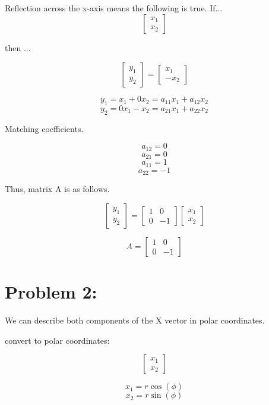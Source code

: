 \begin{enumerate}
\noindent Reflection across the x-axis means the following is true. If...
\[
\begin{bmatrix}
x_1 \\
x_2
\end{bmatrix}
\]

\noindent then ...

\[    
\begin{bmatrix}
y_1 \\
y_2
\end{bmatrix}
= 
\begin{bmatrix}
x_1 \\
-x_2
\end{bmatrix}
\]

\[y_1 = x_1 + 0x_2 = a_{11}x_1+a_{12}x_2\]
\[y_2 = 0x_1-x_2  = a_{21}x_1+a_{22}x_2\]

\noindent Matching coefficients.

\[a_{12} = 0\]
\[a_{21} = 0\]
\[a_{11} = 1\]
\[a_{22} = -1\]

\noindent Thus, matrix A is as follows.

\[
\begin{bmatrix}
y_1 \\
y_2
\end{bmatrix} = 
\begin{bmatrix}
    1 & 0 \\
    0 & -1
\end{bmatrix}  
\begin{bmatrix}
    x_1 \\
    x_2
\end{bmatrix}
\]

\[\boxed{
A=\begin{bmatrix}
    1 & 0 \\
    0 & -1
    \end{bmatrix}}
\]

\section*{Problem 2:}

\noindent We can describe both components of the X vector in polar coordinates.

\noindent convert to polar coordinates:

\[
\begin{bmatrix}
    x_1 \\
    x_2
\end{bmatrix}
\]

\[
x_1 = r \cos(\phi) 
\]
\[
x_2 = r \sin(\phi)
\]


\end{enumerate}
